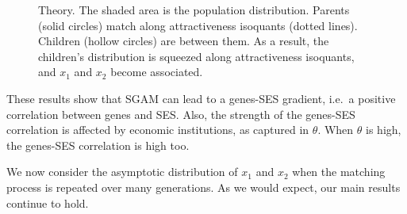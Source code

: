 \documentclass[
  12pt,
]{article}
\theoremstyle{definition}
\theoremstyle{definition}
\theoremstyle{definition}
\theoremstyle{definition}
\theoremstyle{remark}
\begin{document}
\begin{figure}

{\centering {}

}

\caption{Theory. The shaded area is the population distribution. Parents (solid circles) match along attractiveness isoquants (dotted lines). Children (hollow circles) are between them. As a result, the children's distribution is squeezed along attractiveness isoquants, and $x_1$ and $x_2$ become associated.}\label{fig:pic-intuition}
\end{figure}

These results show that SGAM can lead to a genes-SES gradient, i.e.~a positive
correlation between genes and SES. Also, the strength of the genes-SES
correlation is affected by economic institutions, as captured in \(\theta\).
When \(\theta\) is high, the genes-SES correlation is high too.

We now consider the asymptotic distribution of \(x_1\) and \(x_2\) when the matching
process is repeated over many generations. As we would expect, our main results
continue to hold.
\end{document}
